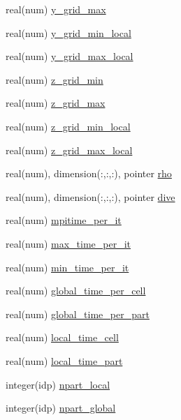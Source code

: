 \begin{DoxyCompactItemize}
\item 
real(num) \hyperlink{namespaceshared__data_a37d0ccaa88ff8097e3e496c1499acb9b}{y\+\_\+grid\+\_\+max}
\item 
real(num) \hyperlink{namespaceshared__data_ae639d9c6de4b202530ffc9c74cfaf75b}{y\+\_\+grid\+\_\+min\+\_\+local}
\item 
real(num) \hyperlink{namespaceshared__data_a2690e59dee9f1fae66f0a6d9abf19b88}{y\+\_\+grid\+\_\+max\+\_\+local}
\item 
real(num) \hyperlink{namespaceshared__data_a16d11c0437372fc94fba8f696cc3435d}{z\+\_\+grid\+\_\+min}
\item 
real(num) \hyperlink{namespaceshared__data_a620f1c71c4db6b0f2b9f0acc6aefa10d}{z\+\_\+grid\+\_\+max}
\item 
real(num) \hyperlink{namespaceshared__data_a09f7e7f94540648ce5317cf34331f893}{z\+\_\+grid\+\_\+min\+\_\+local}
\item 
real(num) \hyperlink{namespaceshared__data_a456c52690b2fd4549464d70435bb3181}{z\+\_\+grid\+\_\+max\+\_\+local}
\item 
real(num), dimension(\+:,\+:,\+:), pointer \hyperlink{namespaceshared__data_a9cd7a07e41ca84210bf52e8480ac5d62}{rho}
\item 
real(num), dimension(\+:,\+:,\+:), pointer \hyperlink{namespaceshared__data_a548e3c8fc335921c106eada05587df31}{dive}
\item 
real(num) \hyperlink{namespaceshared__data_a0a831038bb26f462cfcbb55ed577eca7}{mpitime\+\_\+per\+\_\+it}
\item 
real(num) \hyperlink{namespaceshared__data_ab3fad0c11b277d8e2932f2bb561174c0}{max\+\_\+time\+\_\+per\+\_\+it}
\item 
real(num) \hyperlink{namespaceshared__data_a432338eee67029c7662a11e912c8d46d}{min\+\_\+time\+\_\+per\+\_\+it}
\item 
real(num) \hyperlink{namespaceshared__data_ab51a77acb74b422253df3dd1b679f6dd}{global\+\_\+time\+\_\+per\+\_\+cell}
\item 
real(num) \hyperlink{namespaceshared__data_a689bcd908f5e464afc037e6f78dd6d49}{global\+\_\+time\+\_\+per\+\_\+part}
\item 
real(num) \hyperlink{namespaceshared__data_a66b7cc87acc2d0570007065692788888}{local\+\_\+time\+\_\+cell}
\item 
real(num) \hyperlink{namespaceshared__data_ab078d1e05e9fcee7f81e723b0074f5f9}{local\+\_\+time\+\_\+part}
\item 
integer(idp) \hyperlink{namespaceshared__data_a4d52b152090f02e4e16a9fe24e0e1ec3}{npart\+\_\+local}
\item 
integer(idp) \hyperlink{namespaceshared__data_a630ce8e0e1ba68428eacff437d15f6cc}{npart\+\_\+global}
\end{DoxyCompactItemize}


